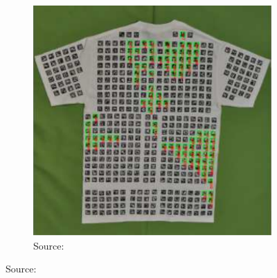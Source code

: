 \documentclass[\home/main.tex]{subfiles}
\begin{document}
\begin{figure}[htpb]{}
    \centering
    \begin{subfigure}[b]{0.80\textwidth}
        \includegraphics[width=\linewidth,keepaspectratio]{figures/instrumentation_markers}
        \caption{Source: \autocite{Bersch2011}}
        \label{fig:towards_instrumentation_markers}
    \end{subfigure}

    \par\bigskip 


\end{figure}
\end{document}
